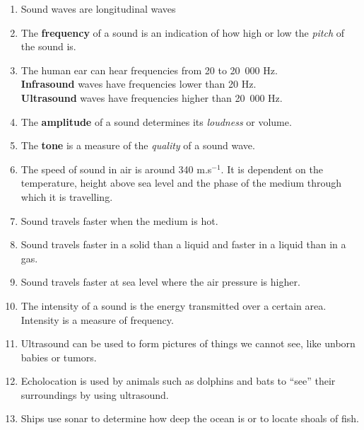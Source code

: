\begin{enumerate}
\item Sound waves are longitudinal waves
\item The \textbf{frequency} of a sound is an indication of how high or low the \emph{pitch} of the sound is.
\item The human ear can hear frequencies from 20 to 20~000 Hz. \\
\textbf{Infrasound} waves have frequencies lower than 20 Hz. \\
\textbf{Ultrasound} waves have frequencies higher than 20~000 Hz.
\item The \textbf{amplitude} of a sound determines its \emph{loudness} or volume.
\item The \textbf{tone} is a measure of the \emph{quality} of a sound wave.
\item The speed of sound in air is around 340 m.s$^{-1}$. It is dependent on the temperature, height above sea level and the phase of the medium through which it is travelling.
\item Sound travels faster when the medium is hot.
\item Sound travels faster in a solid than a liquid and faster in a liquid than in a gas.
\item Sound travels faster at sea level where the air pressure is higher.
\item The intensity of a sound is the energy transmitted over a certain area. Intensity is a measure of frequency.
\item Ultrasound can be used to form pictures of things we cannot see, like unborn babies or tumors.
\item Echolocation is used by animals such as dolphins and bats to ``see'' their surroundings by using ultrasound.
\item Ships use sonar to determine how deep the ocean is or to locate shoals of fish.
\end{enumerate}

